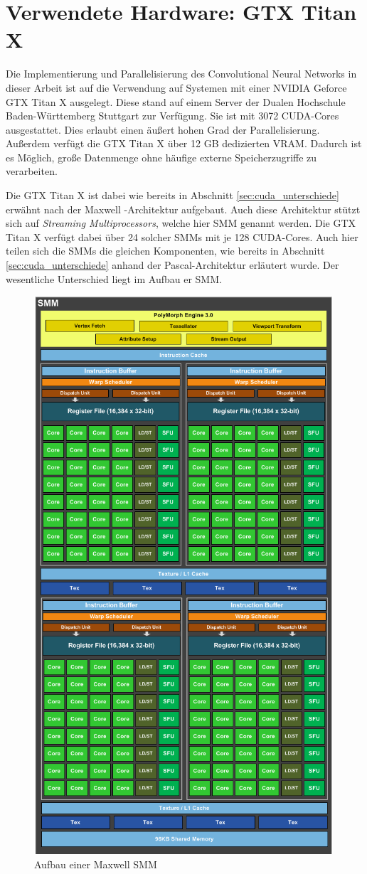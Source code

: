 \documentclass[../main.tex]{subfiles}
\begin{document}
\section{Verwendete Hardware: GTX Titan X} \label{sec:cuda_titan}
Die Implementierung und Parallelisierung des Convolutional Neural Networks in dieser Arbeit ist auf die Verwendung auf Systemen mit einer NVIDIA Geforce GTX Titan X ausgelegt. Diese stand auf einem Server der Dualen Hochschule Baden-Württemberg Stuttgart zur Verfügung. Sie ist mit 3072 CUDA-Cores ausgestattet. Dies erlaubt einen äußert hohen Grad der Parallelisierung. Außerdem verfügt die GTX Titan X über 12 GB dedizierten VRAM. Dadurch ist es Möglich, große Datenmenge ohne häufige externe Speicherzugriffe zu verarbeiten. \par Die GTX Titan X ist dabei wie bereits in Abschnitt \ref{sec:cuda_unterschiede}  erwähnt nach der Maxwell -Architektur aufgebaut. Auch diese Architektur stützt sich auf \emph{Streaming Multiprocessors}, welche hier SMM genannt werden. Die GTX Titan X verfügt dabei über 24 solcher SMMs mit je 128 CUDA-Cores. Auch hier teilen sich die SMMs die gleichen Komponenten, wie bereits in Abschnitt \ref{sec:cuda_unterschiede} anhand der Pascal-Architektur erläutert wurde. Der wesentliche Unterschied liegt im Aufbau er SMM. \par 
\begin{figure}[!htbp]
	\centering
	\includegraphics[width=0.6\linewidth]{../images/Riedle/Maxwell_SMM_Single.png}
	\caption{Aufbau einer Maxwell SMM \cite{CUDA_MAXWELL_White}} \label{pic:cuda_maxwell_smm_single}
\end{figure}
\end{document}
